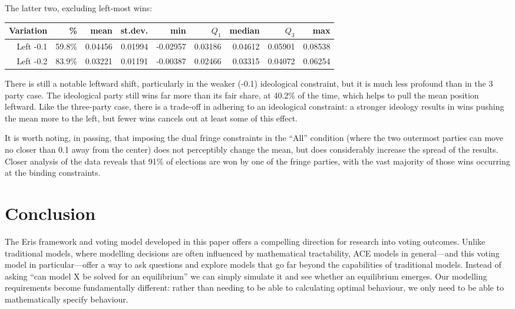 \documentclass[12pt]{article}
\numberwithin{equation}{subsection}
\begin{document}
The latter two, excluding left-most wins:

\begin{tabular}{r|r|r|r|r|r|r|r|r}
    Variation & \% & mean    & st.dev. &      min & $Q_1$   & median  & $Q_3$   & max \\
    \hline
Left -0.1 & 59.8\% & 0.04456 & 0.01994 & -0.02957 & 0.03186 & 0.04612 & 0.05901 & 0.08538  \\
Left -0.2 & 83.9\% & 0.03221 & 0.01191 & -0.00387 & 0.02466 & 0.03315 & 0.04072 & 0.06254  \\
\end{tabular}

There is still a notable leftward shift, particularly in the weaker (-0.1) ideological constraint,
but it is much less profound than in the 3 party case.  The ideological party still wins far more
than its fair share, at 40.2\% of the time, which helps to pull the mean position leftward.  Like
the three-party case, there is a trade-off in adhering to an ideological constraint: a stronger
ideology results in wins pushing the mean more to the left, but fewer wins cancels out at least some
of this effect.

It is worth noting, in passing, that imposing the dual fringe constraints in the ``All'' condition
(where the two outermost parties can move no closer than 0.1 away from the center) does not
perceptibly change the mean, but does considerably increase the spread of the results.  Closer
analysis of the data reveals that 91\% of elections are won by one of the fringe parties, with the
vast majority of those wins occurring at the binding constraints.


\section{Conclusion}\label{s:conc}

The Eris framework and voting model developed in this paper offers a compelling direction for
research into voting outcomes.  Unlike traditional models, where modelling decisions are often
influenced by mathematical tractability, ACE models in general---and this voting model in
particular---offer a way to ask questions and explore models that go far beyond the capabilities of
traditional models.  Instead of asking ``can model X be solved for an equilibrium'' we can simply
simulate it and see whether an equilibrium emerges.  Our modelling requirements become fundamentally
different: rather than needing to be able to calculating optimal behaviour, we only need to be able
to mathematically specify behaviour.
\end{document}
